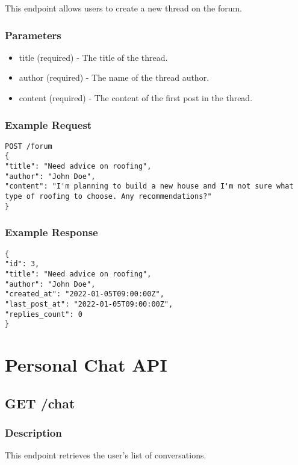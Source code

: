 \documentclass{article}
\begin{document}
This endpoint allows users to create a new thread on the forum.

\subsubsection{Parameters}

\begin{itemize}
\item title (required) - The title of the thread.
\item author (required) - The name of the thread author.
\item content (required) - The content of the first post in the thread.
\end{itemize}

\subsubsection{Example Request}

\begin{verbatim}
POST /forum
{
"title": "Need advice on roofing",
"author": "John Doe",
"content": "I'm planning to build a new house and I'm not sure what type of roofing to choose. Any recommendations?"
}
\end{verbatim}

\subsubsection{Example Response}

\begin{verbatim}
{
"id": 3,
"title": "Need advice on roofing",
"author": "John Doe",
"created_at": "2022-01-05T09:00:00Z",
"last_post_at": "2022-01-05T09:00:00Z",
"replies_count": 0
}
\end{verbatim}

\section{Personal Chat API}

\subsection{GET /chat}

\subsubsection{Description}

This endpoint retrieves the user's list of conversations.
\end{document}
